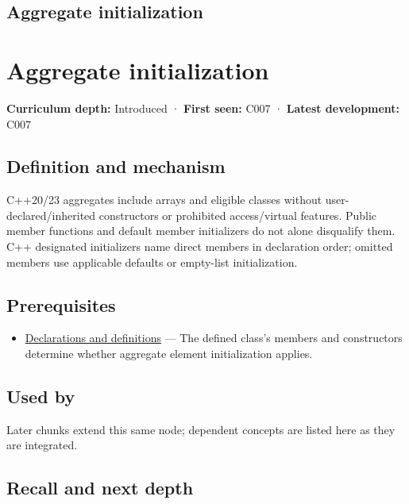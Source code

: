 \hypertarget{appendix-b7174c179542}{}
\section*{Aggregate initialization}
\chapter{Aggregate initialization}\label{appendix-b7174c179542-aggregate-initialization}

\textbf{Curriculum depth:} Introduced · \textbf{First seen:} C007 · \textbf{Latest development:} C007

\section{Definition and mechanism}\label{appendix-b7174c179542-definition-and-mechanism}

C++20/23 aggregates include arrays and eligible classes without user-declared/inherited constructors or prohibited access/virtual features. Public member functions and default member initializers do not alone disqualify them. C++ designated initializers name direct members in declaration order; omitted members use applicable defaults or empty-list initialization.

\section{Prerequisites}\label{appendix-b7174c179542-prerequisites}

\begin{itemize}
\tightlist
\item
  \hyperref[appendix-2e4d494c2d94]{Declarations and definitions} --- The defined class's members and constructors determine whether aggregate element initialization applies.
\end{itemize}

\section{Used by}\label{appendix-b7174c179542-used-by}

Later chunks extend this same node; dependent concepts are listed here as they are integrated.

\section{Recall and next depth}\label{appendix-b7174c179542-recall-and-next-depth}

